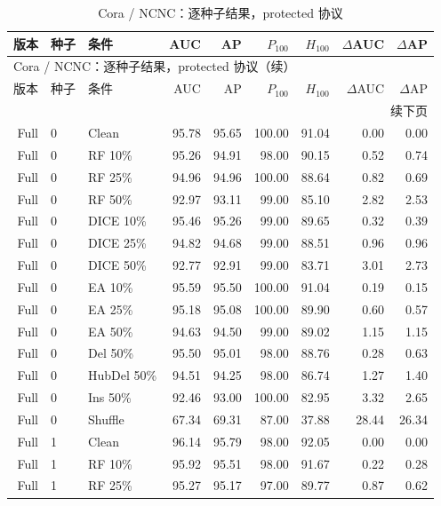 {\footnotesize
\setlength{\tabcolsep}{3.2pt}
\renewcommand{\arraystretch}{1.10}
\begin{longtable}{rllrrrrrr}
\caption{Cora / NCNC：逐种子结果，protected 协议}\\
\toprule
版本 & 种子 & 条件 & AUC & AP & $P_{100}$ & $H_{100}$ & $\Delta$AUC & $\Delta$AP \\
\midrule
\endfirsthead
\multicolumn{9}{l}{Cora / NCNC：逐种子结果，protected 协议（续）}\\
\toprule
版本 & 种子 & 条件 & AUC & AP & $P_{100}$ & $H_{100}$ & $\Delta$AUC & $\Delta$AP \\
\midrule
\endhead
\midrule\multicolumn{9}{r}{续下页}\\
\endfoot
\bottomrule
\endlastfoot
Full & 0 & Clean & 95.78 & 95.65 & 100.00 & 91.04 & 0.00 & 0.00 \\
Full & 0 & RF 10\% & 95.26 & 94.91 & 98.00 & 90.15 & 0.52 & 0.74 \\
Full & 0 & RF 25\% & 94.96 & 94.96 & 100.00 & 88.64 & 0.82 & 0.69 \\
Full & 0 & RF 50\% & 92.97 & 93.11 & 99.00 & 85.10 & 2.82 & 2.53 \\
Full & 0 & DICE 10\% & 95.46 & 95.26 & 99.00 & 89.65 & 0.32 & 0.39 \\
Full & 0 & DICE 25\% & 94.82 & 94.68 & 99.00 & 88.51 & 0.96 & 0.96 \\
Full & 0 & DICE 50\% & 92.77 & 92.91 & 99.00 & 83.71 & 3.01 & 2.73 \\
Full & 0 & EA 10\% & 95.59 & 95.50 & 100.00 & 91.04 & 0.19 & 0.15 \\
Full & 0 & EA 25\% & 95.18 & 95.08 & 100.00 & 89.90 & 0.60 & 0.57 \\
Full & 0 & EA 50\% & 94.63 & 94.50 & 99.00 & 89.02 & 1.15 & 1.15 \\
Full & 0 & Del 50\% & 95.50 & 95.01 & 98.00 & 88.76 & 0.28 & 0.63 \\
Full & 0 & HubDel 50\% & 94.51 & 94.25 & 98.00 & 86.74 & 1.27 & 1.40 \\
Full & 0 & Ins 50\% & 92.46 & 93.00 & 100.00 & 82.95 & 3.32 & 2.65 \\
Full & 0 & Shuffle & 67.34 & 69.31 & 87.00 & 37.88 & 28.44 & 26.34 \\
Full & 1 & Clean & 96.14 & 95.79 & 98.00 & 92.05 & 0.00 & 0.00 \\
Full & 1 & RF 10\% & 95.92 & 95.51 & 98.00 & 91.67 & 0.22 & 0.28 \\
Full & 1 & RF 25\% & 95.27 & 95.17 & 97.00 & 89.77 & 0.87 & 0.62 \\

\end{longtable}}
